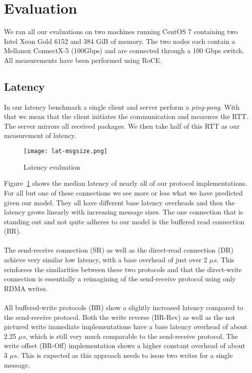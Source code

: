 \section{Evaluation}

We ran all our evaluations on two machines running CentOS 7 containing two Intel Xeon Gold 6152 and 384 GiB of memory.
The two nodes each contain a Mellanox ConnectX-5 (100Gbps) and are connected through a 100 Gbps switch. All measurements
have been performed using RoCE.

\subsection{Latency}

 In our latency benchmark a single client and server perform a \emph{ping-pong}. With that 
we mean that the client initiates the communication and measures the RTT. The server mirrors all received packages. 
We then take half of this RTT as our measurement of latency.

\begin{figure}[h]
\texttt{[image: lat-msgsize.png]}
\caption{Latency evaluation}
\label{fig:plot-lat}
\end{figure}


Figure~\ref{fig:plot-lat} shows the median latency of nearly all of our protocol implementations. For all but one of these 
connections we see more or less what we have predicted given our model. They all have different base latency overheads
and then the latency grows linearly with increasing message sizes. The one connection that is standing out
and not quite adheres to our model is the buffered read connection (BR).

\paragraph{} The send-receive connection (SR) as well as the direct-read connection (DR) achieve very similar low latency,
with a base overhead of just over 2 $\mu s$. This reinforces the similarities between these two protocols and that the 
direct-write connection is essentially a reimagining of the send-receive protocol using only RDMA writes.



\paragraph{} All buffered-write protocols (BR) show a slightly increased latency compared to the send-receive protocol.
Both the write reverse (BR-Rev) as well as the not pictured write immediate implementations have a base latency overhead 
of about 2.25 $\mu s$, which is still very much comparable to the send-receive protocol. The write offset 
(BR-Off) implementation shows a higher constant overhead of about 3 $\mu s$. This is expected as this approach needs to 
issue two writes for a single message.


